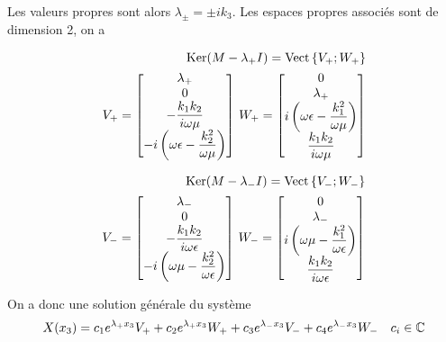 Les valeurs propres sont alors $\lambda_\pm = \pm i k_3$. Les espaces propres associés sont de dimension 2, on a 

\begin{align}
\operatorname{Ker}(M-\lambda_+I)=\operatorname{Vect}\left\lbrace V_+;W_+\right\rbrace \\
    V_+ = 
    \begin{bmatrix}
    \lambda_+ \\
        0 \\
        -\dfrac{k_1k_2}{i\omega\mu} \\
        -i\left(\omega\epsilon - \dfrac{k_2^2}{\omega\mu}\right) \\
    \end{bmatrix}
    \,
    W_+ = 
        \begin{bmatrix}
        0 \\
        \lambda_+ \\
        i\left(\omega\epsilon - \dfrac{k_1^2}{\omega\mu}\right) \\
        \dfrac{k_1k_2}{i\omega\mu} \\
    \end{bmatrix}
\end{align}

\begin{align}
\operatorname{Ker}(M-\lambda_-I)=\operatorname{Vect}\left\lbrace V_-;W_-\right\rbrace\\
    V_- = 
    \begin{bmatrix}
        \lambda_- \\
        0 \\
        -\dfrac{k_1k_2}{i\omega\epsilon} \\
        -i\left(\omega\mu - \dfrac{k_2^2}{\omega\epsilon}\right) \\
    \end{bmatrix}
    \,
    W_- = 
    \begin{bmatrix}
        0 \\
        \lambda_- \\
        i\left(\omega\mu - \dfrac{k_1^2}{\omega\epsilon}\right) \\
        \dfrac{k_1k_2}{i\omega\epsilon} \\
    \end{bmatrix}
\end{align}


On a donc une solution générale du système 
\begin{equation}
    X(x_3) = c_1e^{\lambda_+ x_3}V_+  + c_2e^{\lambda_+ x_3}W_+ + c_3e^{\lambda_- x_3}V_- +c_4e^{\lambda_- x_3}W_- \quad c_i \in \mathbb C
\end{equation}



